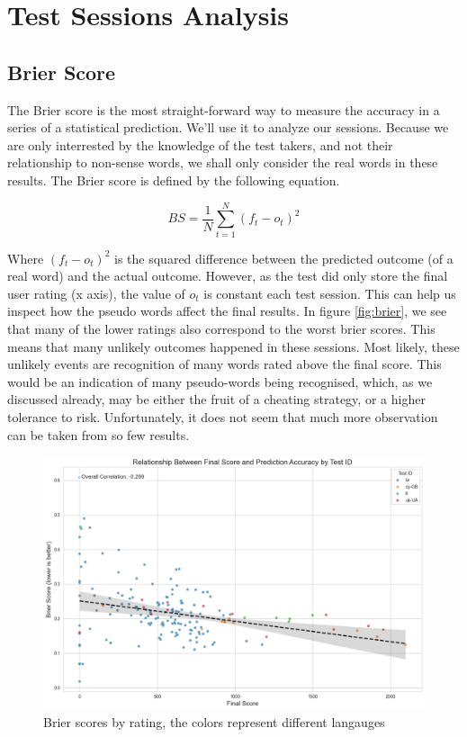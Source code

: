 \section{Test Sessions Analysis}
\subsection{Brier Score}
The Brier score is the most straight-forward way to measure the accuracy in a series of a statistical prediction. We'll use it to analyze our sessions. Because we are only interrested by the knowledge of the test takers, and not their relationship to non-sense words, we shall only consider the real words in these results. The Brier score is defined by the following equation.

\begin{equation}
    BS=\frac{1}{N}\sum^{N}_{t=1} (f_t - o_t)^2
\end{equation}\label{eq:brier-score}

Where $(f_t - o_t)^2$ is the squared difference between the predicted outcome (of a real word) and the actual outcome. However, as the test did only store the final user rating (x axis), the value of $o_t$ is constant each test session. This can help us inspect how the pseudo words affect the final results. In figure \ref{fig:brier}, we see that many of the lower ratings also correspond to the worst brier scores. This means that many unlikely outcomes happened in these sessions. Most likely, these unlikely events are recognition of many words rated above the final score. This would be an indication of many pseudo-words being recognised, which, as we discussed already, may be either the fruit of a cheating strategy, or a higher tolerance to risk.  Unfortunately, it does not seem that much more observation can be taken from so few results.

\begin{figure}
    \centering
    \includegraphics[width=0.8\linewidth]{figures/brier_score.png}
    \caption{Brier scores by rating, the colors represent different langauges}
    \medskip
    \small
    
\end{figure}\label{fig:brier}

